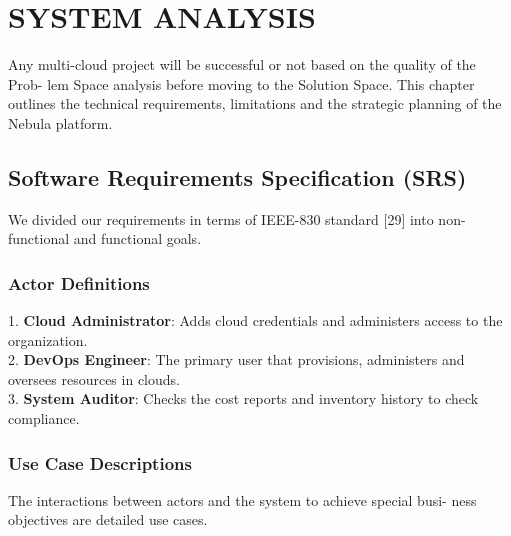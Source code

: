 \chapter{SYSTEM ANALYSIS}

Any multi-cloud project will be successful or not based on the quality of the Prob- lem Space analysis before moving to the Solution Space. This chapter outlines the technical requirements, limitations and the strategic planning of the Nebula platform.

\section{Software Requirements Specification (SRS)}
We divided our requirements in terms of IEEE-830 standard [29] into non-functional and functional goals.

\subsection{Actor Definitions}
1. \textbf{Cloud Administrator}: Adds cloud credentials and administers access to the organization. \\
2. \textbf{DevOps Engineer}: The primary user that provisions, administers and oversees resources in clouds. \\
3. \textbf{System Auditor}: Checks the cost reports and inventory history to check compliance.

\subsection{Use Case Descriptions}
The interactions between actors and the system to achieve special busi- ness objectives are detailed use cases.

